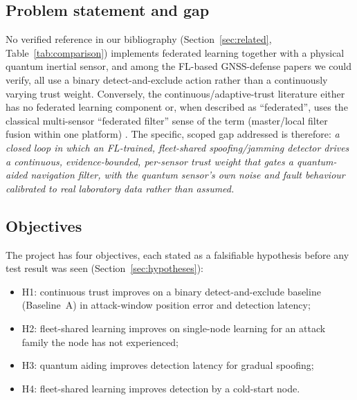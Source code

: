 \documentclass[12pt,a4paper]{article}
\begin{document}
\subsection{Problem statement and gap}
\label{sec:gap}
No verified reference in our bibliography (Section~\ref{sec:related}, Table~\ref{tab:comparison}) implements federated learning together with a physical quantum inertial sensor, and among the FL-based GNSS-defense papers we could verify, all use a binary detect-and-exclude action rather than a continuously varying trust weight. Conversely, the continuous/adaptive-trust literature either has no federated learning component or, when described as ``federated'', uses the classical multi-sensor ``federated filter'' sense of the term (master/local filter fusion within one platform) \cite{negru2024resilient}. The specific, scoped gap addressed is therefore: \emph{a closed loop in which an FL-trained, fleet-shared spoofing/jamming detector drives a continuous, evidence-bounded, per-sensor trust weight that gates a quantum-aided navigation filter, with the quantum sensor's own noise and fault behaviour calibrated to real laboratory data rather than assumed.}

\subsection{Objectives}
The project has four objectives, each stated as a falsifiable hypothesis before any test result was seen (Section~\ref{sec:hypotheses}):
\begin{itemize}[nosep]
\item H1: continuous trust improves on a binary detect-and-exclude baseline (Baseline~A) in attack-window position error and detection latency;
\item H2: fleet-shared learning improves on single-node learning for an attack family the node has not experienced;
\item H3: quantum aiding improves detection latency for gradual spoofing;
\item H4: fleet-shared learning improves detection by a cold-start node.
\end{itemize}
\end{document}
